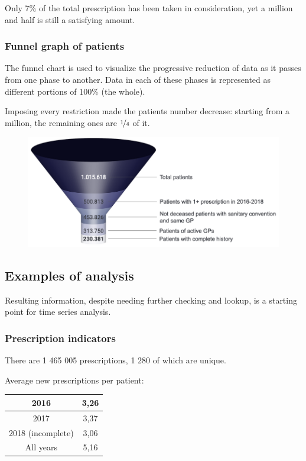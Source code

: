 Only 7\% of the total prescription has been taken in consideration, yet a million and half is still a satisfying amount.

\subsubsection{Funnel graph of patients}
The funnel chart is used to visualize the progressive reduction of data as it passes from one phase to another. Data in each of these phases is represented as different portions of 100\% (the whole)\cite{funnel}.

Imposing every restriction made the patients number decrease: starting from a million, the remaining ones are $\nicefrac{1}{4}$ of it.
\begin{figure}[h]
	\centering
	\includegraphics[scale=0.5]{images/funnel.png}
\end{figure}

\subsection{Examples of analysis}
Resulting information, despite needing further checking and lookup, is a starting point for time series analysis.

\subsubsection{Prescription indicators}
There are 1 465 005 prescriptions, 1 280 of which are unique.

Average new prescriptions per patient:
\begin{center}
	\small
	\begin{tabular}{c|c}
		2016 & 3,26 \\
		\hline
		2017 & 3,37 \\
		\hline
		2018 (incomplete) & 3,06 \\
		\hline
		All years & 5,16
	\end{tabular}
\end{center}


